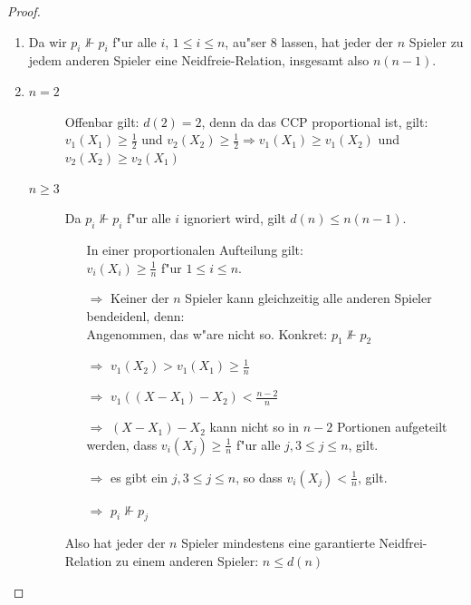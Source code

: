 \documentclass[11pt, a4paper, twoside]{article}
\numberwithin{equation}{section}
\begin{document}
\begin{proof}
 \begin{enumerate}
  \item Da wir $p_i\nVdash p_i$ f"ur alle $i$, $1\leq i\leq n$, au"ser 8 lassen, hat jeder der $n$ Spieler zu jedem anderen Spieler eine
        Neidfreie-Relation, insgesamt also $n(n-1)$.
  \item \begin{description}
         \item[$n=2$] Offenbar gilt: $d(2)=2$, denn da das CCP proportional ist, gilt: $v_1(X_1)\geq\frac{1}{2}$ und $v_2(X_2)\geq\frac{1}{2}
                    \Rightarrow v_1(X_1)\geq v_1(X_2)$ und $v_2(X_2)\geq v_2(X_1)$
         \item[$n\geq3$] Da $p_i\nVdash p_i$ f"ur alle $i$ ignoriert wird, gilt $d(n)\leq n(n-1)$.
                         \begin{itemize}
                          \item[] In einer proportionalen Aufteilung gilt:\\$v_i(X_i)\geq\frac{1}{n}$ f"ur $1\leq i\leq n$.\\
                          \item[$\Rightarrow$] Keiner der $n$ Spieler kann gleichzeitig alle anderen Spieler bendeidenl, denn:\\
                                               Angenommen, das w"are nicht so. Konkret: $p_1\nVdash p_2$
                          \item[$\Rightarrow$]$v_1(X_2)>v_1(X_1)\geq\frac{1}{n}$
                          \item[$\Rightarrow$]$v_1((X-X_1)-X_2)<\frac{n-2}{n}$
                          \item[$\Rightarrow$]$(X-X_1)-X_2$ kann nicht so in $n-2$ Portionen aufgeteilt werden, dass $v_i(X_j)\geq\frac{1}{n}$
                                              f"ur alle $j,3\leq j\leq n$, gilt.
                          \item[$\Rightarrow$]es gibt ein $j,3\leq j\leq n$, so dass $v_i(X_j)<\frac{1}{n}$, gilt.
                          \item[$\Rightarrow$]$p_i\nVdash p_j$
                         \end{itemize}
                         Also hat jeder der $n$ Spieler mindestens eine garantierte Neidfrei-Relation zu einem anderen Spieler: $n\leq d(n)$  
        \end{description}
 \end{enumerate}
\end{proof}
\end{document}
